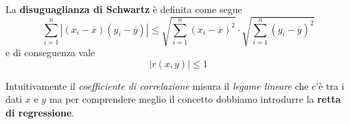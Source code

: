 \begin{definition}
	La \textbf{disuguaglianza di Schwartz} è definita come segue
	\[
		\sum_{i=1}^n |(x_i - \overline{x}) (y_i - \overline{y})| \leq
		\sqrt{\sum_{i=1}^n (x_i - \overline{x})^2} \cdot \sqrt{\sum_{i=1}^n (y_i - \overline{y})^2}
	\]
	e di conseguenza vale \[ |r(x, y)| \leq 1 \]
\end{definition}

Intuitivamente il \emph{coefficiente di correlazione} misura il \emph{legame lineare} che c'è tra i dati $x$ e $y$ ma per
comprendere meglio il concetto dobbiamo introdurre la \textbf{retta di regressione}.
